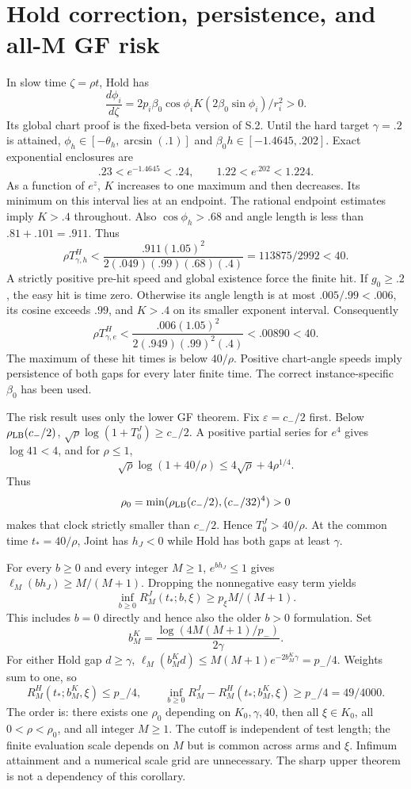 \documentclass[11pt,a4paper]{article}
\begin{document}
\section{Hold correction, persistence, and all-M GF risk}

In slow time $\zeta=\rho t$, Hold has
\[
 \frac{d\phi_i}{d\zeta}=2p_i\beta_0\cos\phi_i K(2\beta_0\sin\phi_i)/r_i^2>0 .
\]
Its global chart proof is the fixed-beta version of S.2. Until the hard target $\gamma=.2$ is attained, $\phi_h\in[-\theta_h,\arcsin(.1)]$ and $\beta_0h\in[-1.4645,.202]$. Exact exponential enclosures are
\[
 .23<e^{-1.4645}<.24,\qquad 1.22<e^{.202}<1.224.
\]
As a function of $e^z$, $K$ increases to one maximum and then decreases. Its minimum on this interval lies at an endpoint. The rational endpoint estimates imply $K>.4$ throughout. Also $\cos\phi_h>.68$ and angle length is less than $.81+.101=.911$. Thus
\[
 \rho T_{\gamma,h}^{H}<
 \frac{.911(1.05)^2}{2(.049)(.99)(.68)(.4)}
 =113875/2992<40 .
\]
A strictly positive pre-hit speed and global existence force the finite hit. If $g_0\ge.2$, the easy hit is time zero. Otherwise its angle length is at most $.005/.99<.006$, its cosine exceeds $.99$, and $K>.4$ on its smaller exponent interval. Consequently
\[
 \rho T_{\gamma,e}^{H}<
 \frac{.006(1.05)^2}{2(.949)(.99)^2(.4)}<.00890<40 .
\]
The maximum of these hit times is below $40/\rho$. Positive chart-angle speeds imply persistence of both gaps for every later finite time. The correct instance-specific $\beta_0$ has been used.

The risk result uses only the lower GF theorem. Fix $\varepsilon=c_-/2$ first. Below $\rho_{\rm LB}(c_-/2)$,
$\sqrt\rho\log(1+T_0^J)\ge c_-/2$. A positive partial series for $e^4$ gives $\log41<4$, and for $\rho\le1$,
\[
 \sqrt\rho\log(1+40/\rho)\le4\sqrt\rho+4\rho^{1/4}.
\]
Thus
\[
 \rho_0=\min(\rho_{\rm LB}(c_-/2),(c_-/32)^4)>0
\]
makes that clock strictly smaller than $c_-/2$. Hence $T_0^J>40/\rho$. At the common time $t_*=40/\rho$, Joint has $h_J<0$ while Hold has both gaps at least $\gamma$.

For every $b\ge0$ and every integer $M\ge1$, $e^{bh_J}\le1$ gives $\ell_M(bh_J)\ge M/(M+1)$. Dropping the nonnegative easy term yields
\[
 \inf_{b\ge0}R_M^J(t_*;b,\xi)\ge p_\xi M/(M+1).
\]
This includes $b=0$ directly and hence also the older $b>0$ formulation. Set
\[
 b_M^K=\frac{\log(4M(M+1)/p_-)}{2\gamma}.
\]
For either Hold gap $d\ge\gamma$,
$\ell_M(b_M^Kd)\le M(M+1)e^{-2b_M^K\gamma}=p_-/4$. Weights sum to one, so
\[
 R_M^H(t_*;b_M^K,\xi)\le p_-/4,\qquad
 \inf_{b\ge0}R_M^J-R_M^H(t_*;b_M^K,\xi)\ge p_-/4=49/4000.
\]
The order is: there exists one $\rho_0$ depending on $K_0,\gamma,40$, then all $\xi\in K_0$, all $0<\rho<\rho_0$, and all integer $M\ge1$. The cutoff is independent of test length; the finite evaluation scale depends on $M$ but is common across arms and $\xi$. Infimum attainment and a numerical scale grid are unnecessary. The sharp upper theorem is not a dependency of this corollary.
\end{document}
